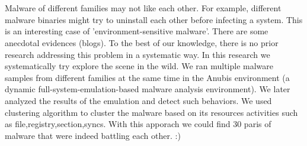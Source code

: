 \chapter{\abstractname}

Malware of different families may not like each other. For example, different malware binaries might try to uninstall each other before infecting a system. This is an interesting case of 'environment-sensitive malware'. There are some anecdotal evidences (blogs). To the best of our knowledge, there is no prior research addressing this problem in a systematic way. In this research we systematically try explore the scene in the wild. We ran multiple malware samples from different families at the same time in the Anubis environment (a dynamic full-system-emulation-based malware analysis environment). We later analyzed the results of the emulation and detect such behaviors.
We used clustering algorithm to cluster the malware based on its resources activities such as file,registry,section,syncs. With this apporach we could find 30 paris of malware that were indeed battling each other. :)



